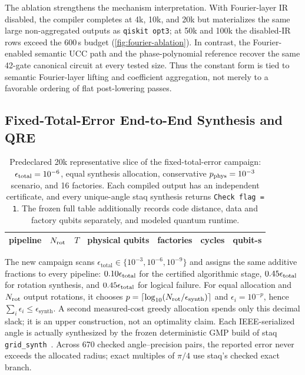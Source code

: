 \documentclass[aps,prx,reprint,floatfix,superscriptaddress]{revtex4-2}
\begin{document}
The ablation strengthens the mechanism interpretation. With Fourier-layer
IR disabled, the compiler completes at 4k, 10k, and 20k but materializes
the same large non-aggregated outputs as \texttt{qiskit opt3}; at 50k
and 100k the disabled-IR rows exceed the 600\,s budget
(\cref{fig:fourier-ablation}). In contrast, the Fourier-enabled semantic
UCC path and the phase-polynomial reference recover the same 42-gate
canonical circuit at every tested size. Thus the constant form is tied
to semantic Fourier-layer lifting and coefficient aggregation, not
merely to a favorable ordering of flat post-lowering passes.

\subsection{Fixed-Total-Error End-to-End Synthesis and QRE}

\begin{table}[t]
\centering
\scriptsize
\begin{tabular}{l r r r r r r}
\toprule
pipeline & $N_{\rm rot}$ & $T$ & physical qubits & factories & cycles & qubit-s \\
\midrule

\end{tabular}
\caption{Predeclared 20k representative slice of the fixed-total-error
campaign: $\epsilon_{\rm total}=10^{-6}$, equal synthesis allocation,
conservative $p_{\rm phys}=10^{-3}$ scenario, and 16 factories.  Each compiled
output has an independent certificate, and every unique-angle staq synthesis
returns \texttt{Check flag = 1}.  The frozen full table additionally records
code distance, data and factory qubits separately, and modeled quantum runtime.}
\label{tab:resource-consequence}
\end{table}

The new campaign scans
$\epsilon_{\mathrm{total}}\in\{10^{-3},10^{-6},10^{-9}\}$ and assigns the
same additive fractions to every pipeline:
$0.10\epsilon_{\rm total}$ for the certified algorithmic stage,
$0.45\epsilon_{\rm total}$ for rotation synthesis, and
$0.45\epsilon_{\rm total}$ for logical failure.  For equal allocation and
$N_{\rm rot}$ output rotations, it chooses
$p=\lceil\log_{10}(N_{\rm rot}/\epsilon_{\mathrm{synth}})\rceil$ and
$\epsilon_i=10^{-p}$, hence
$\sum_i\epsilon_i\leq\epsilon_{\mathrm{synth}}$.  A second measured-cost
greedy allocation spends only this decimal slack; it is an upper construction,
not an optimality claim.  Each IEEE-serialized angle is actually synthesized
by the frozen deterministic GMP build of staq
\texttt{grid\_synth}~\cite{amy2020staq,ross2016optimal}.  Across
670 checked angle--precision pairs, the reported error never exceeds the
allocated radius; exact multiples of $\pi/4$ use staq's checked exact branch.
\end{document}
